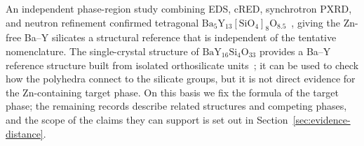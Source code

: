 An independent phase-region study combining EDS, cRED, synchrotron PXRD, and neutron refinement confirmed tetragonal $\mathrm{Ba_5Y_{13}[SiO_4]_8O_{8.5}}$~\cite{gulay2024navigation}, giving the Zn-free Ba--Y silicates a structural reference that is independent of the tentative nomenclature. The single-crystal structure of $\mathrm{BaY_{16}Si_4O_{33}}$ provides a Ba--Y reference structure built from isolated orthosilicate units~\cite{motozawa2022bay16si4o33}; it can be used to check how the polyhedra connect to the silicate groups, but it is not direct evidence for the Zn-containing target phase. On this basis we fix the formula of the target phase; the remaining records describe related structures and competing phases, and the scope of the claims they can support is set out in Section~\ref{sec:evidence-distance}.
